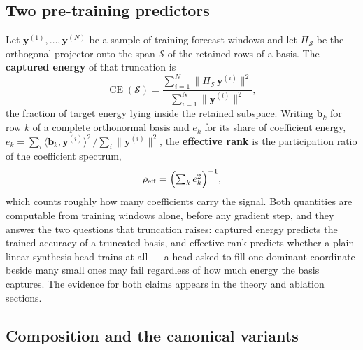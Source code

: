 \subsection{Two pre-training predictors}
\label{sec:method_predictors}

Let $\mathbf{y}^{(1)},\dots,\mathbf{y}^{(N)}$ be a sample of training
forecast windows and let $\Pi_{\mathcal{S}}$ be the orthogonal projector onto
the span $\mathcal{S}$ of the retained rows of a basis. The
\textbf{captured energy} of that truncation is
\begin{equation}
\label{eq:capture}
\operatorname{CE}(\mathcal{S})
=\frac{\sum_{i=1}^{N}\bigl\lVert\Pi_{\mathcal{S}}\,\mathbf{y}^{(i)}\bigr\rVert^{2}}
      {\sum_{i=1}^{N}\lVert\mathbf{y}^{(i)}\rVert^{2}},
\end{equation}
the fraction of target energy lying inside the retained subspace. Writing
$\mathbf{b}_k$ for row $k$ of a complete orthonormal basis and $e_k$ for its
share of coefficient energy,
$e_k=\sum_{i}\langle\mathbf{b}_k,\mathbf{y}^{(i)}\rangle^{2}\,
/\sum_{i}\lVert\mathbf{y}^{(i)}\rVert^{2}$, the \textbf{effective rank} is
the participation ratio of the coefficient spectrum,
\begin{equation}
\label{eq:effrank}
\rho_{\mathrm{eff}}=\Bigl(\textstyle\sum_{k}e_k^{2}\Bigr)^{-1},
\end{equation}
which counts roughly how many coefficients carry the signal. Both quantities
are computable from training windows alone, before any gradient step, and
they answer the two questions that truncation raises: captured energy
predicts the trained accuracy of a truncated basis, and effective rank
predicts whether a plain linear synthesis head trains at all --- a head asked
to fill one dominant coordinate beside many small ones may fail regardless of
how much energy the basis captures. The evidence for both claims appears in
the theory and ablation sections.

\subsection{Composition and the canonical variants}
\label{sec:method_variants}

